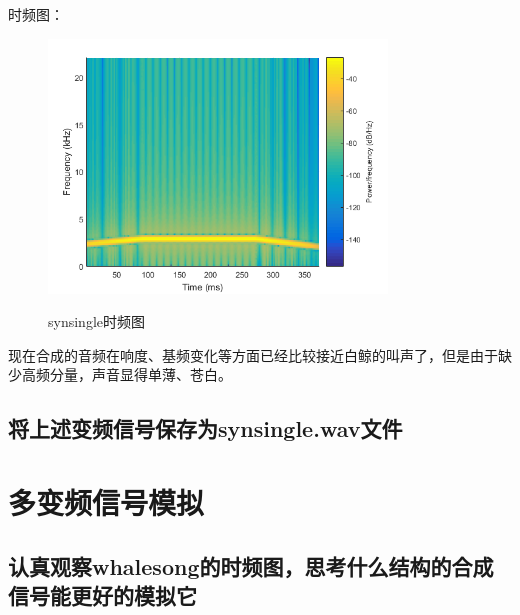 \documentclass{article}
\begin{document}
            时频图：
            \begin{figure}[H]
                \centering
                \includegraphics[width=9cm]{figure9.png}
                \label{fig:synsingle-ft}\caption{synsingle时频图}
            \end{figure}
            
            现在合成的音频在响度、基频变化等方面已经比较接近白鲸的叫声了，但是由于缺少高频分量，声音显得单薄、苍白。
            
        \subsection{将上述变频信号保存为synsingle.wav文件}
        
    \section{多变频信号模拟}
        \subsection{认真观察whalesong的时频图，思考什么结构的合成信号能更好的模拟它}
        
\end{document}
